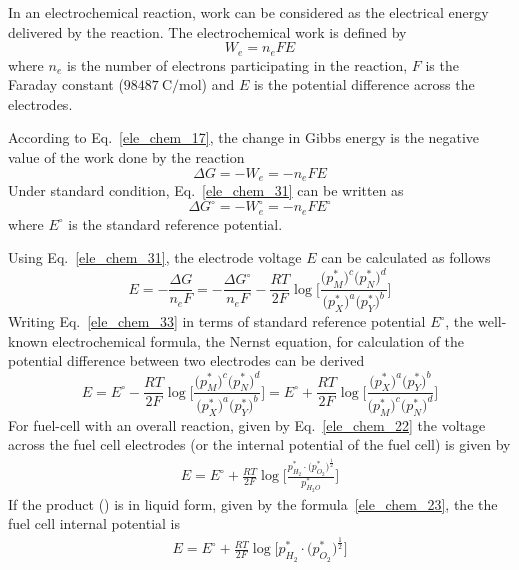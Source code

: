 \documentclass[12pt,a4paper]{scrartcl}
\begin{document}
\begin{onehalfspace}
In an electrochemical reaction, work can be considered as the electrical energy delivered by the reaction. The electrochemical work is defined by
\begin{equation}\label{ele_chem_30}
W_e=n_eFE
\end{equation}
where $n_e$ is the number of electrons participating in the reaction, $F$ is the Faraday constant ($\SI{98487}{\coulomb\per\mole}$) and $E$ is the potential difference across the electrodes.

According to Eq.~\eqref{ele_chem_17}, the change in Gibbs energy is the negative value of the work done by the reaction
\begin{equation}\label{ele_chem_31}
	\Delta G = -W_e=-n_eFE
\end{equation}
Under standard condition, Eq.~\eqref{ele_chem_31} can be written as
\begin{equation}\label{ele_chem_32}
	\Delta G^\circ = -W_e^\circ=-n_eFE^\circ
\end{equation}
where $E^\circ$ is the standard reference potential.

Using Eq.~\eqref{ele_chem_31}, the electrode voltage $E$ can be calculated as follows
\begin{equation}\label{ele_chem_33}
	E = -\frac{\Delta G}{n_eF} = -\frac{\Delta G^\circ}{n_eF} - \frac{RT}{2F}\log{\Bigg[\frac{\Big({p_M^*}\Big)^c\Big({p_N^*}\Big)^d}{\Big({p_X^*}\Big)^a\Big({p_Y^*}\Big)^b}\Bigg]}
\end{equation}
Writing Eq.~\eqref{ele_chem_33} in terms of standard reference potential $E^\circ$, the well-known electrochemical formula, the Nernst equation, for calculation of the potential difference between two electrodes can be derived
\begin{equation}\label{ele_chem_34}
	E = E^\circ -  \frac{RT}{2F}\log{\Bigg[\frac{\Big({p_M^*}\Big)^c \Big({p_N^*}\Big)^d}{\Big({p_X^*}\Big)^a\Big({p_Y^*}\Big)^b}\Bigg]} = E^\circ +  \frac{RT}{2F}\log{\Bigg[\frac{\Big({p_X^*}\Big)^a\Big({p_Y^*}\Big)^b}{\Big({p_M^*}\Big)^c\Big({p_N^*}\Big)^d}\Bigg]}
\end{equation}
For fuel-cell with an overall reaction, given by Eq.~\eqref{ele_chem_22} the voltage across the fuel cell electrodes (or the internal potential of the fuel cell) is given by
\begin{equation}\label{ele_chem_35}
	\begin{aligned}
		E = E^\circ + \frac{RT}{2F}\log\Bigg[\frac{{p_{H_2}^*\cdot\Big(p_{O_2}^*\Big)^{\frac{1}{2}}}}{p_{H_2O}^*}\Bigg]
	\end{aligned}
\end{equation}
If the product () is in liquid form, given by the formula~\ref{ele_chem_23}, the the fuel cell internal potential is 
\begin{equation}\label{ele_chem_36}
	\begin{aligned}
		E = E^\circ + \frac{RT}{2F}\log\Bigg[{{p_{H_2}^*\cdot\Big(p_{O_2}^*\Big)^{\frac{1}{2}}}}\Bigg]
	\end{aligned}
\end{equation}








\end{onehalfspace}
\end{document}
